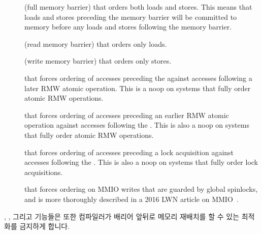 \begin{description}
\item	[] (full memory barrier) that orders both loads and
	stores.
	This means that loads and stores preceding the memory barrier
	will be committed to memory before any loads and stores
	following the memory barrier.
\item	[] (read memory barrier) that orders only loads.
\item	[] (write memory barrier) that orders only stores.
\item	[] that forces ordering of accesses
	preceding the  against accesses following
	a later RMW atomic operation.
	This is a noop on systems that fully order atomic RMW operations.
\item	[] that forces ordering of accesses
	preceding an earlier RMW atomic operation against accesses
	following the .
	This is also a noop on systems that fully order atomic RMW operations.
\item	[] that forces ordering of accesses
	preceding a lock acquisition against accesses
	following the .
	This is also a noop on systems that fully order lock acquisitions.
\item	[] that forces ordering on MMIO writes that are guarded
	by global spinlocks, and is more thoroughly described
	in a 2016 LWN article on MMIO~\cite{PaulEMcKenney2016LinuxKernelMMIO}.

\fi

\end{description}

, , 그리고  기능들은 또한 컴파일러가
배리어 앞뒤로 메모리 재배치를 할 수 있는 최적화를 금지하게 합니다.

